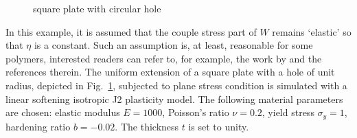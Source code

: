 \documentclass[3p,sort&compress,11pt,fleqn,review]{elsarticle}
\newcommand*{\figref}[1]{Fig.~\ref{#1}}
\begin{document}
\begin{figure}[htb]
\centering\footnotesize
{}
\caption{square plate with circular hole}\label{fig:plate_with_hole}
\end{figure}
In this example, it is assumed that the couple stress part of $W$ remains `elastic' so that $\eta$ is a constant. Such an assumption is, at least, reasonable for some polymers, interested readers can refer to, for example, the work by \citet{Alisafaei2016} and the references therein. The uniform extension of a square plate with a hole of unit radius, depicted in \figref{fig:plate_with_hole}, subjected to plane stress condition is simulated with a linear softening isotropic J2 plasticity model. The following material parameters are chosen: elastic modulus $E=\num{1000}$, Poisson's ratio $\nu=\num{0.2}$, yield stress $\sigma_y=\num{1}$, hardening ratio $b=\num{-0.02}$. The thickness $t$ is set to unity.
%
%
%
\end{document}
